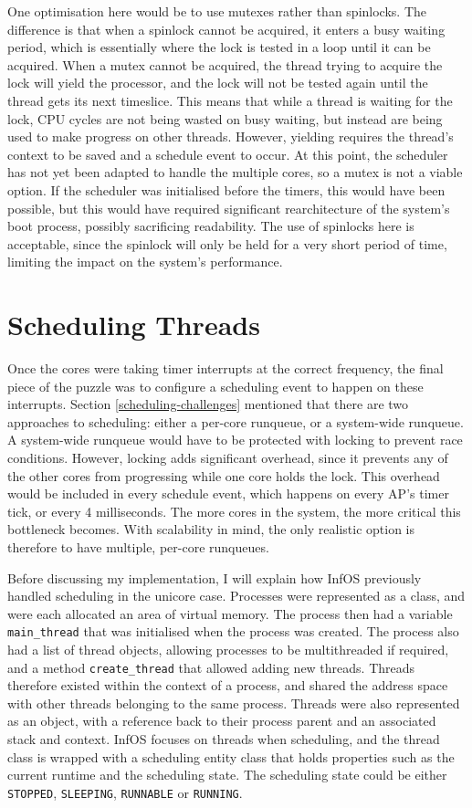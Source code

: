 \documentclass[bsc,frontabs,singlespacing,parskip,deptreport]{infthesis}
\begin{document}
One optimisation here would be to use mutexes rather than spinlocks. The difference is that when a spinlock cannot be acquired, it enters a busy waiting period, which is essentially where the lock is tested in a loop until it can be acquired. When a mutex cannot be acquired, the thread trying to acquire the lock will yield the processor, and the lock will not be tested again until the thread gets its next timeslice. This means that while a thread is waiting for the lock, CPU cycles are not being wasted on busy waiting, but instead are being used to make progress on other threads. However, yielding requires the thread's context to be saved and a schedule event to occur. At this point, the scheduler has not yet been adapted to handle the multiple cores, so a mutex is not a viable option. If the scheduler was initialised before the timers, this would have been possible, but this would have required significant rearchitecture of the system's boot process, possibly sacrificing readability. The use of spinlocks here is acceptable, since the spinlock will only be held for a very short period of time, limiting the impact on the system's performance.

\section{Scheduling Threads} \label{scheduling-threads}
Once the cores were taking timer interrupts at the correct frequency, the final piece of the puzzle was to configure a scheduling event to happen on these interrupts. Section \ref{scheduling-challenges} mentioned that there are two approaches to scheduling: either a per-core runqueue, or a system-wide runqueue. A system-wide runqueue would have to be protected with locking to prevent race conditions. However, locking adds significant overhead, since it prevents any of the other cores from progressing while one core holds the lock. This overhead would be included in every schedule event, which happens on every AP's timer tick, or every 4 milliseconds. The more cores in the system, the more critical this bottleneck becomes. With scalability in mind, the only realistic option is therefore to have multiple, per-core runqueues.

Before discussing my implementation, I will explain how InfOS previously handled scheduling in the unicore case. Processes were represented as a class, and were each allocated an area of virtual memory. The process then had a variable \verb|main_thread| that was initialised when the process was created. The process also had a list of thread objects, allowing processes to be multithreaded if required, and a method \verb|create_thread| that allowed adding new threads. Threads therefore existed within the context of a process, and shared the address space with other threads belonging to the same process. Threads were also represented as an object, with a reference back to their process parent and an associated stack and context. InfOS focuses on threads when scheduling, and the thread class is wrapped with a scheduling entity class that holds properties such as the current runtime and the scheduling state. The scheduling state could be either \verb|STOPPED|, \verb|SLEEPING|, \verb|RUNNABLE| or \verb|RUNNING|.
\end{document}
